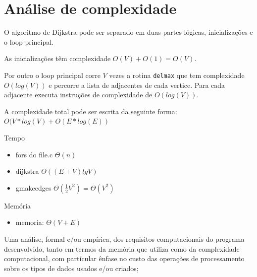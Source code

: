 \documentclass[a4paper, 18pt]{article}
\newcommand\tu[0]{\textunderscore}
\begin{document}
\section{Análise de complexidade}
	\par
	O algoritmo de Dijkstra pode ser separado em duas partes 
lógicas, inicializações e o loop principal.
	\par
	As inicializações têm complexidade $O(V) + O(1) = O(V)$. 
	\par 
	Por outro o loop principal corre $V$ vezes a rotina \texttt{delmax} que tem 
complexidade $O(log(V))$ e percorre a lista de adjacentes de cada vertice. Para 
cada adjacente executa instruções de complexidade de $O(log(V))$.
	\par A complexidade total pode ser escrita da seguinte forma: 
$O(V*log(V) + O(E*log(E))$
	\par
	Tempo
	\begin{itemize}
		\item fors do file.c $\Theta(n)$
		\item dijkstra $\Theta((E+V) lg V)$
		\item g\tu make\tu edges $\Theta(\frac{1}{2}V^2) = \Theta(V^2)$
	\end{itemize}
	\par
	Memória
	\begin{itemize}
		\item memoria: $\Theta(V + E)$
	\end{itemize}
	\par
	Uma análise, formal e/ou empírica, dos requisitos computacionais do programa desenvolvido, tanto em termos da memória que utiliza como da complexidade computacional, com particular ênfase no custo das operações de processamento sobre os tipos de dados usados e/ou criados;
\end{document}
